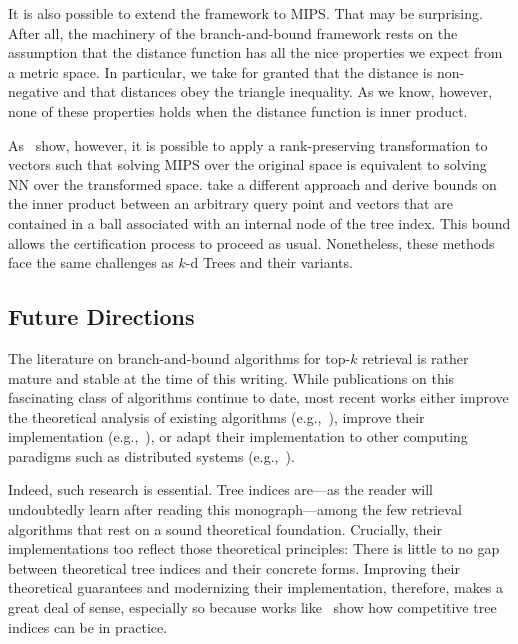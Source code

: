 \medskip

It is also possible to extend the framework to MIPS.
That may be surprising. After all, the machinery of the branch-and-bound
framework rests on the assumption that the
distance function has all the nice properties we expect from a metric space.
In particular, we take for granted that the distance is non-negative and that
distances obey the triangle inequality. As we know, however, none of these
properties holds when the distance function is inner product.

As~\cite{xbox-tree} show, however, it is possible to apply a rank-preserving
transformation to vectors such that solving MIPS over the original space
is equivalent to solving NN over the transformed space. \cite{conetrees}
take a different approach and derive bounds on the inner product between
an arbitrary query point and vectors that are contained in a ball associated
with an internal node of the tree index. This bound allows the certification
process to proceed as usual. Nonetheless, these methods face the same challenges
as $k$-d Trees and their variants.

\subsection{Future Directions}

The literature on branch-and-bound algorithms for top-$k$ retrieval is rather mature
and stable at the time of this writing.
While publications on this fascinating class of algorithms
continue to date, most recent works either improve the theoretical analysis of existing
algorithms (e.g.,~\citep{elkin2023compressed-cover-trees}),
improve their implementation (e.g.,~\citep{ram2019revisiting_kdtree}),
or adapt their implementation to other computing paradigms such as distributed systems
(e.g.,~\citep{parallel-cover-trees}).

Indeed, such research is essential. Tree indices are---as the reader will undoubtedly
learn after reading this monograph---among the few retrieval algorithms that rest on
a sound theoretical foundation. Crucially, their implementations too reflect those
theoretical principles: There is little to no gap between theoretical tree indices and
their concrete forms. Improving their theoretical guarantees and modernizing their
implementation, therefore, makes a great deal of sense,
especially so because works like~\citep{ram2019revisiting_kdtree} show
how competitive tree indices can be in practice.

